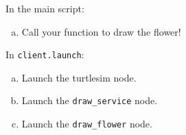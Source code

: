 In the main script:
\begin{enumerate}[(a)]
  \item Call your function to draw the flower!
\end{enumerate}

In \texttt{client.launch}:
\begin{enumerate}[(a)]
  \item Launch the turtlesim node.
  \item Launch the \texttt{draw\_service} node.
  \item  Launch the \texttt{draw\_flower} node.
\end{enumerate}
